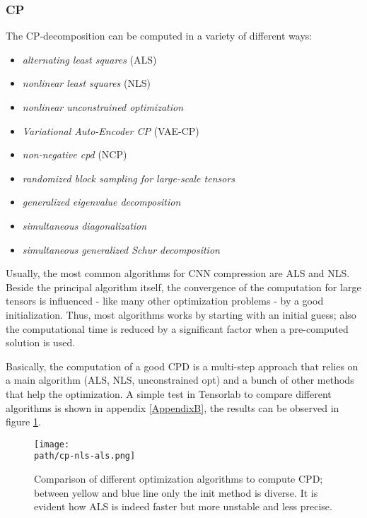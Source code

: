 \subsubsection{CP}
The CP-decomposition can be computed in a variety of different ways: 
    \begin{itemize}
        \item \emph{alternating least squares} (ALS)
        \item \emph{nonlinear least squares} (NLS)
        \item \emph{nonlinear unconstrained optimization}
        \item \emph{Variational Auto-Encoder CP} (VAE-CP)
        \item \emph{non-negative cpd} (NCP)
        \item \emph{randomized block sampling for large-scale tensors}
        \item \emph{generalized eigenvalue decomposition}
        \item \emph{simultaneous diagonalization}
        \item \emph{simultaneous generalized Schur decomposition}
\end{itemize}
Usually, the most common algorithms for CNN compression are ALS and NLS. \\
Beside the principal algorithm itself, the convergence of the computation for large tensors is influenced - like many other optimization problems - by a good initialization. Thus, most algorithms works by starting with an initial guess; also the computational time is reduced by a significant factor when a pre-computed solution is used. 
\newline

Basically, the computation of a good CPD is a multi-step approach that relies on a main algorithm (ALS, NLS, unconstrained opt) and a bunch of other methods that help the optimization. 
A simple test in Tensorlab to compare different algorithms is shown in appendix \ref{AppendixB}, the results can be observed in figure \ref{fig:cp-als-nls}.

\begin{figure}[h!]
 \centering
 \texttt{[image: \\path/cp-nls-als.png]} 
 \caption{Comparison of different optimization algorithms to compute CPD; between yellow and blue line only the init method is diverse. It is evident how ALS is indeed faster but more unstable and less precise.}
 \label{fig:cp-als-nls}
\end{figure} 

